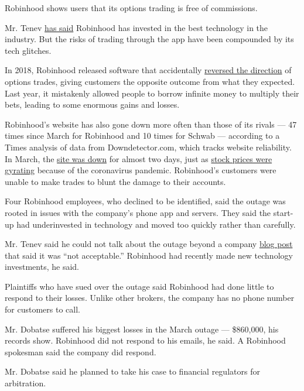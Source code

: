 Robinhood shows users that its options trading is free of commissions.~

Mr. Tenev
\href{https://www.wealthmanagement.com/technology/robinhood-ceo-schwab-fidelity-not-really-technology-companies}{has
said} Robinhood has invested in the best technology in the industry. But
the risks of trading through the app have been compounded by its tech
glitches.

In 2018, Robinhood released software that accidentally
\href{https://www.elitetrader.com/et/threads/robinhood-options-errors.327998/}{reversed
the direction} of options trades, giving customers the opposite outcome
from what they expected. Last year, it mistakenly allowed people to
borrow infinite money to multiply their bets, leading to some enormous
gains and losses.

Robinhood's website has also gone down more often than those of its
rivals --- 47 times since March for Robinhood and 10 times for Schwab
--- according to a Times analysis of data from Downdetector.com, which
tracks website reliability. In March, the
\href{https://www.nytimes.com/2020/03/03/technology/trading-app-robinhood-outage.html}{site
was down} for almost two days, just as
\href{https://www.nytimes.com/2020/03/11/business/bear-market-stocks-dow.html}{stock
prices were gyrating} because of the coronavirus pandemic. Robinhood's
customers were unable to make trades to blunt the damage to their
accounts.

Four Robinhood employees, who declined to be identified, said the outage
was rooted in issues with the company's phone app and servers. They said
the start-up had underinvested in technology and moved too quickly
rather than carefully.

Mr. Tenev said he could not talk about the outage beyond a company
\href{https://blog.robinhood.com/news/2020/3/3/an-update-from-robinhoods-founders}{blog
post} that said it was ``not acceptable.'' Robinhood had recently made
new technology investments, he said.

Plaintiffs who have sued over the outage said Robinhood had done little
to respond to their losses. Unlike other brokers, the company has no
phone number for customers to call.

Mr. Dobatse suffered his biggest losses in the March outage ---
\$860,000, his records show. Robinhood did not respond to his emails, he
said. A Robinhood spokesman said the company did respond.

Mr. Dobatse said he planned to take his case to financial regulators for
arbitration.

